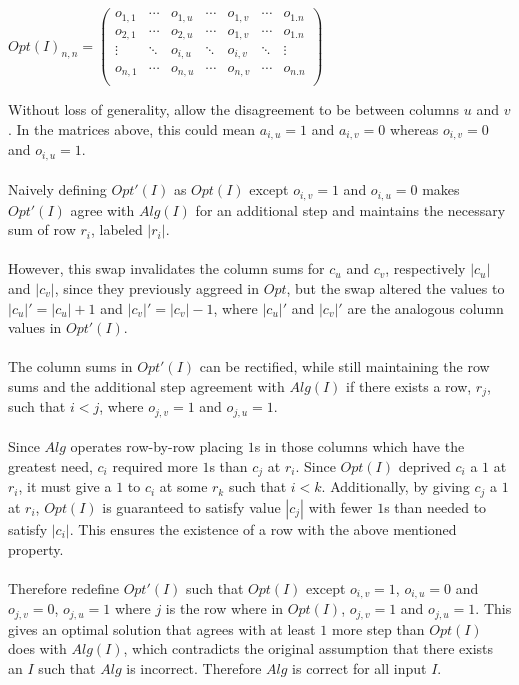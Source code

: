 \documentclass[12pt]{article}
\begin{document}
\begin{center}
$
Opt(I)_{n,n} = 
    \begin{pmatrix}
    o_{1,1} & \cdots & o_{1,u} & \cdots & o_{1,v} & \cdots & o_{1.n} \\
    o_{2,1} & \cdots & o_{2,u} & \cdots & o_{1,v} & \cdots & o_{1.n} \\
    \vdots  & \ddots & o_{i,u} & \ddots & o_{i,v} & \ddots & \vdots \\ 
    o_{n,1} & \cdots & o_{n,u} & \cdots & o_{n,v} & \cdots & o_{n.n} \\
    \end{pmatrix}
$ 
\end{center}
Without loss of generality, allow the disagreement to be between columns
$u$ and $v$.  In the matrices above, this could mean $a_{i,u}=1$ and
$a_{i,v}=0$ whereas $o_{i,v}=0$ and $o_{i,u}=1$.\\\\
Naively defining $Opt'(I)$ as $Opt(I)$ except $o_{i,v}=1$ and $o_{i,u}=0$
makes $Opt'(I)$ agree with $Alg(I)$ for an additional step and maintains
the necessary sum of row $r_i$, labeled $|r_i|$.\\\\
However, this swap invalidates the
column sums for $c_u$ and $c_v$, respectively $|c_u|$ and $|c_v|$, since they
previously aggreed in $Opt$, but the swap altered the values to $|c_u|' = |c_u|+1$
and $|c_v|'=|c_v|-1$, where $|c_u|'$ and $|c_v|'$ are the analogous column values
in $Opt'(I)$.\\\\
The column sums in $Opt'(I)$ can be rectified, while still maintaining the row sums
and the additional step agreement with $Alg(I)$ if there exists a row, $r_j$, such
that $i < j$, where $o_{j,v} = 1$ and $o_{j,u}=1$.\\\\
Since $Alg$ operates row-by-row placing $1$s in those columns which have the greatest
need, $c_i$ required more $1$s than $c_j$ at $r_i$.  Since $Opt(I)$ deprived $c_i$ a 
$1$ at $r_i$, it must give a $1$ to $c_i$ at some $r_k$ such that $i < k$.  Additionally,
by giving $c_j$ a $1$ at $r_i$, $Opt(I)$ is guaranteed to satisfy value $|c_j|$ with fewer
$1$s than needed to satisfy $|c_i|$.  This ensures the existence of a row with the
above mentioned property.\\\\
Therefore redefine $Opt'(I)$ such that $Opt(I)$ except $o_{i,v}=1$, $o_{i,u}=0$ and
$o_{j,v}=0$, $o_{j,u}=1$
where $j$ is the row where in $Opt(I)$, $o_{j,v}=1$ and $o_{j,u}=1$.  This gives an optimal
solution that agrees with at least $1$ more step than $Opt(I)$ does with $Alg(I)$, which
contradicts the original assumption that there exists an $I$ such that $Alg$ is incorrect.
Therefore $Alg$ is correct for all input $I$.
\end{document}

